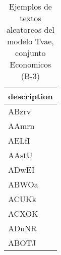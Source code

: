 \begin{table}[H]
\centering
\fontsize{8}{14}\selectfont
\caption{Ejemplos de textos aleatoreos del modelo Tvae, conjunto Economicos (B-3)}
\label{table-sample10-economicos-b-3-tvae-text}
\begin{tabular}{|m{50em}|}
\hline
\rowcolor[gray]{0.8}
description \\
\hline ABzrv \\
\hline AAmrn \\
\hline AELfI \\
\hline AAstU \\
\hline ADwEI \\
\hline ABWOa \\
\hline ACUKk \\
\hline ACXOK \\
\hline ADuNR \\
\hline ABOTJ \\
\hline
\end{tabular}
\end{table}

